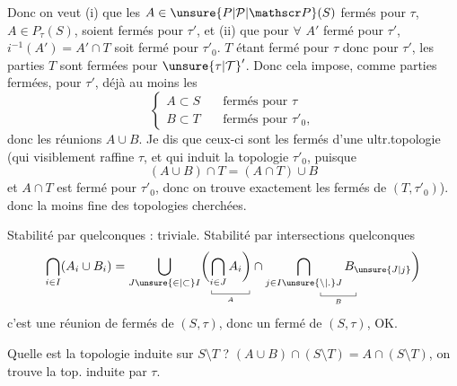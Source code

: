 Donc on veut (i) que les $A\in\unsure{P|\mathcal P|\mathscr P}(S)$ fermés pour $\tau$,  $A\in P_\tau(S)$, soient fermés pour $\tau'$,  et (ii) que pour \uline{$\forall$} $A'$ fermé pour $\tau'$, $i^{-1}(A')=A'\cap T$ soit fermé pour $\tau'_0$.  $T$ étant fermé  pour $\tau$ donc pour $\tau'$, les parties    $T$  sont fermées
pour $ {\unsure{\tau|\mathcal T}}'$. Donc cela impose, comme parties fermées, pour $\tau'$, déjà au moins les
\[
\left\{\begin{aligned}
 A\subset S&\quad\text{fermés pour }\tau\\
 B\subset T&\quad\text{fermés pour }\tau'_0,
\end{aligned}\right.
\]
donc les réunions $A\cup B$. Je dis que ceux-ci sont  les fermés d'une ultr.topologie (qui visiblement raffine $\tau$, et qui induit la topologie $\tau'_0$, puisque
\[
 (A\cup B)\cap T=(A\cap T)\cup B
\]
et $A\cap T$ est fermé pour $\tau'_0$, donc on trouve exactement les fermés de $(T,\tau'_0)$).
 donc la  moins fine des topologies cherchées.

 Stabilité par  quelconques : triviale. Stabilité par intersections quelconques
\[
 \bigcap_{i\in I}(A_i\cup B_i)=
 \bigcup_{J\unsure{\in|\subset} I}
 \biggl(\underset{\underset{A}{\rule{.35pt}{.3em}\rule{3em}{.35pt}\rule{.35pt}{.3em}}}{\bigcap_{i\in J}A_i\biggr)}
 \cap\underset{\underset{B}{\rule{.35pt}{.3em}\rule{2.8em}{.35pt}\rule{.35pt}{.3em}}}{\bigcap_{j\in I\unsure{\setminus|\mathord{.}} J} B_{\unsure{J|j}}}\biggr)
\]
c'est une réunion de fermés de $(S,\tau)$, donc un fermé de $(S,\tau)$, OK.

Quelle est la topologie induite  sur $S\setminus T$ ? $(A\cup B)\cap(S\setminus T)=A\cap(S\setminus T)$, on trouve la top. induite par $\tau$.

